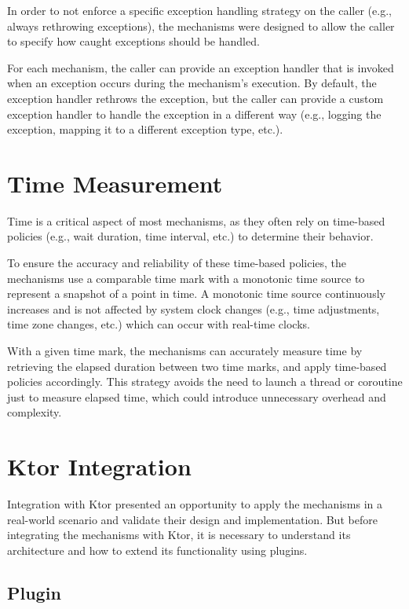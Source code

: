 In order to not enforce a specific exception handling strategy on the caller (e.g., always rethrowing exceptions),
the mechanisms were designed to allow the caller to specify how caught exceptions should be handled.

For each mechanism,
the caller can provide an exception handler that is invoked when an exception occurs during the mechanism's execution.
By default, the exception handler rethrows the exception,
but the caller can provide a custom exception handler to handle the exception in a different way
(e.g., logging the exception, mapping it to a different exception type, etc.).


\section{Time Measurement}\label{sec:time-measurement}

Time is a critical aspect of most mechanisms,
as they often rely on time-based policies (e.g., wait duration, time interval, etc.) to determine their behavior.

To ensure the accuracy and reliability of these time-based policies,
the mechanisms use a comparable time mark with a monotonic time source to represent a snapshot of a point in time.
A monotonic time source continuously increases and is not affected by system clock changes (e.g., time adjustments, time zone changes, etc.) which can occur with real-time clocks.

With a given time mark,
the mechanisms can accurately measure time by retrieving the elapsed duration between two time marks,
and apply time-based policies accordingly.
This strategy avoids the need to launch a thread or coroutine just to
measure elapsed time, which could introduce unnecessary overhead and complexity.


\section{Ktor Integration}\label{sec:ktor-integration}

Integration with Ktor presented an opportunity to apply the mechanisms in a real-world scenario
and validate their design and implementation.
But before integrating the mechanisms with Ktor, it is necessary to understand its architecture and how to extend its functionality using plugins.

\subsection{Plugin}\label{subsec:plugin}

